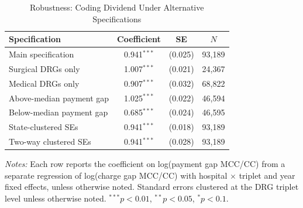 \begin{table}[htbp]
\centering
\caption{Robustness: Coding Dividend Under Alternative Specifications}
\label{tab:robust}
\begin{tabular}{lccc}
\hline\hline
Specification & Coefficient & SE & $N$ \\
\hline
Main specification & 0.941$^{***}$ & (0.025) & 93,189 \\
Surgical DRGs only & 1.007$^{***}$ & (0.021) & 24,367 \\
Medical DRGs only & 0.907$^{***}$ & (0.032) & 68,822 \\
Above-median payment gap & 1.025$^{***}$ & (0.022) & 46,594 \\
Below-median payment gap & 0.685$^{***}$ & (0.024) & 46,595 \\
State-clustered SEs & 0.941$^{***}$ & (0.018) & 93,189 \\
Two-way clustered SEs & 0.941$^{***}$ & (0.028) & 93,189 \\
\hline\hline
\end{tabular}
\begin{tablenotes}[flushleft]\small
\item \textit{Notes:} Each row reports the coefficient on log(payment gap MCC/CC) from a separate regression of log(charge gap MCC/CC) with hospital $\times$ triplet and year fixed effects, unless otherwise noted. Standard errors clustered at the DRG triplet level unless otherwise noted. $^{***}p<0.01$, $^{**}p<0.05$, $^{*}p<0.1$.
\end{tablenotes}
\end{table}

